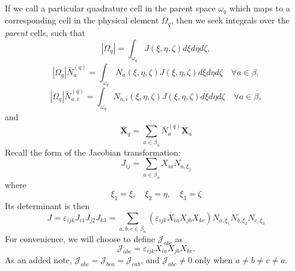 \documentclass[11pt]{article} %
\begin{document}
If we call a particular quadrature cell in the parent space $\omega_q$ which maps to a corresponding cell in the physical element $\Omega_q$, then we seek integrals over the \textit{parent} cells, such that
\begin{equation}
	| \Omega_q | = \int_{\omega_q} J( \xi, \eta, \zeta ) d \xi d \eta d \zeta,
\end{equation}
\begin{equation}
	| \Omega_q | \bar{N}_{a}^{(q)} = \int_{\omega_q} N_a ( \xi, \eta, \zeta ) J( \xi, \eta, \zeta ) d \xi d \eta d \zeta \quad \forall a \in \beta,
\end{equation}
\begin{equation}
	| \Omega_q | \bar{N}_{a,i}^{(q)} = \int_{\omega_q} N_{a,i} ( \xi, \eta, \zeta ) J( \xi, \eta, \zeta ) d \xi d \eta d \zeta \quad \forall a \in \beta,
\end{equation}
and
\begin{equation}
	\bar{\mathbf{X}}_q = \sum_{a \in \beta_n} \bar{N}_{a}^{(q)} \mathbf{X}_a
\end{equation}
Recall the form of the Jacobian transformation:
\begin{equation}
	J_{ij} = \sum_{a \in \beta_n} X_{ia} N_{a,\xi_j}
\end{equation}
where
\begin{equation}
	\xi_1 = \xi, \quad \xi_2 = \eta, \quad \xi_3 = \zeta
\end{equation}
Its determinant is then
\begin{equation}
	J = \varepsilon_{ijk} J_{i 1} J_{j 2} J_{k 3} = \sum_{a,b,c \in \beta_n} (\varepsilon_{ijk} X_{ia} X_{jb} X_{kc}) N_{a,\xi_1} N_{b,\xi_2} N_{c,\xi_3}
\end{equation}
For convenience, we will choose to define $\mathcal{J}_{abc}$ as
\begin{equation}
	\mathcal{J}_{abc} = \varepsilon_{ijk} X_{ia} X_{jb} X_{kc}.
\end{equation}
As an added note, $\mathcal{J}_{abc} = \mathcal{J}_{bca} = \mathcal{J}_{cab}$, and $\mathcal{J}_{abc} \neq 0$ only when $a \neq b \neq c \neq a$.
\end{document}
